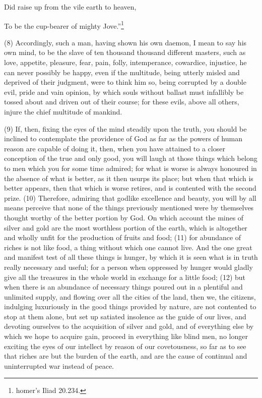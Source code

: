 Did raise up from the vile earth to heaven,

To be the cup-bearer of mighty Jove.''\footnote{homer's Iliad 20.234.}

(8) Accordingly, such a man, having shown his own daemon, I mean to say his own mind, to be the
slave of ten thousand thousand different masters, such as love, appetite, pleasure, fear, pain, folly,
intemperance, cowardice, injustice, he can never possibly be happy, even if the multitude, being
utterly misled and deprived of their judgment, were to think him so, being corrupted by a double evil,
pride and vain opinion, by which souls without ballast must infallibly be tossed about and driven out
of their course; for these evils, above all others, injure the chief multitude of mankind.

(9) If, then, fixing the eyes of the mind steadily upon the truth, you should be inclined to contemplate
the providence of God as far as the powers of human reason are capable of doing it, then, when
you have attained to a closer conception of the true and only good, you will laugh at those things
which belong to men which you for some time admired; for what is worse is always honoured in the
absence of what is better, as it then usurps its place; but when that which is better appears, then
that which is worse retires, and is contented with the second prize. (10) Therefore, admiring that
godlike excellence and beauty, you will by all means perceive that none of the things previously
mentioned were by themselves thought worthy of the better portion by God. On which account the
mines of silver and gold are the most worthless portion of the earth, which is altogether and wholly
unfit for the production of fruits and food; (11) for abundance of riches is not like food, a thing
without which one cannot live. And the one great and manifest test of all these things is hunger, by
which it is seen what is in truth really necessary and useful; for a person when oppressed by
hunger would gladly give all the treasures in the whole world in exchange for a little food; (12) but
when there is an abundance of necessary things poured out in a plentiful and unlimited supply, and
flowing over all the cities of the land, then we, the citizens, indulging luxuriously in the good things
provided by nature, are not contented to stop at them alone, but set up satiated insolence as the
guide of our lives, and devoting ourselves to the acquisition of silver and gold, and of everything
else by which we hope to acquire gain, proceed in everything like blind men, no longer exciting the
eyes of our intellect by reason of our covetousness, so far as to see that riches are but the burden
of the earth, and are the cause of continual and uninterrupted war instead of peace.

